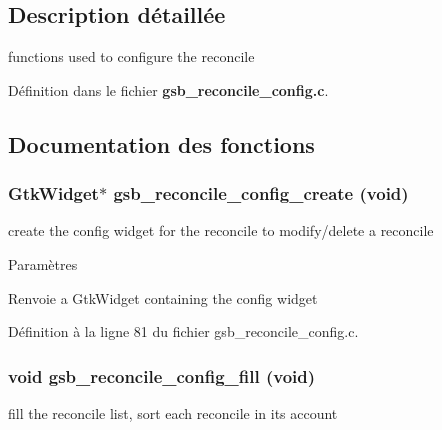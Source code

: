 \subsection{Description détaillée}
functions used to configure the reconcile 

Définition dans le fichier {\bf gsb\_\-reconcile\_\-config.c}.



\subsection{Documentation des fonctions}
\subsubsection[{gsb\_\-reconcile\_\-config\_\-create}]{\setlength{\rightskip}{0pt plus 5cm}GtkWidget$\ast$ gsb\_\-reconcile\_\-config\_\-create (void)}\label{gsb__reconcile__config_8c_abf6c093002bc28727d4a18adc03dc8a6}
create the config widget for the reconcile to modify/delete a reconcile


\begin{DoxyParams}{Paramètres}
\item[{\em }]\end{DoxyParams}
\begin{DoxyReturn}{Renvoie}
a GtkWidget containing the config widget 
\end{DoxyReturn}


Définition à la ligne 81 du fichier gsb\_\-reconcile\_\-config.c.

\subsubsection[{gsb\_\-reconcile\_\-config\_\-fill}]{\setlength{\rightskip}{0pt plus 5cm}void gsb\_\-reconcile\_\-config\_\-fill (void)}\label{gsb__reconcile__config_8c_ad5401fdce4c4df7cc8807a3aba71721c}
fill the reconcile list, sort each reconcile in its account


